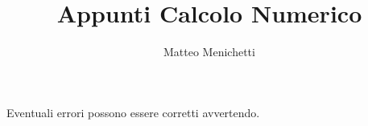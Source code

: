 \documentclass[a4paper,10pt]{article}
\numberwithin{equation}{section}
\theoremstyle{definition}
\begin{document}
\title{Appunti Calcolo Numerico}
\author{Matteo Menichetti}
\maketitle

\noindent Eventuali errori possono essere corretti avvertendo.

\tableofcontents

\clearpage

\printglossary























%
\end{document}
